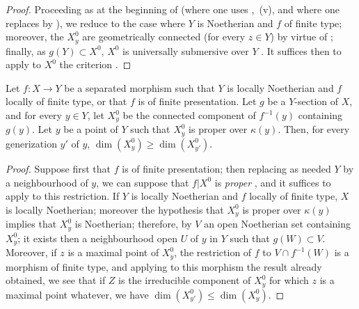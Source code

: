\begin{proof}
Proceeding as at the beginning of  (where one uses ,~(v), and where one replaces  by ), we reduce to the case where $Y$ is Noetherian and $f$ of finite type; moreover, the $X_y^0$ are geometrically connected (for every $z\in Y$) by virtue of ; finally, as $g(Y)\subset X^0$, $X^0$ is universally submersive over $Y$ .
It suffices then to apply to $X^0$ the criterion .
\end{proof}

\begin{corollary}[15.6.9]
\label{IV.15.6.9}
Let $f:X\to Y$ be a separated morphism such that $Y$ is locally Noetherian and $f$ locally of finite type, or that $f$ is of finite presentation.
Let $g$ be a $Y$-section of $X$, and for every $y\in Y$, let $X_y^0$ be the connected component of $f^{-1}(y)$ containing $g(y)$.
Let $y$ be a point of $Y$ such that $X_y^0$ is proper over $\kappa(y)$.
Then, for every generization $y'$ of $y$, $\dim(X_y^0)\geq\dim(X_{y'}^0)$.
\end{corollary}

\begin{proof}
Suppose first that $f$ is of finite presentation; then replacing as needed $Y$ by a neighbourhood of $y$, we can suppose that $f|X^0$ is \emph{proper} , and it suffices to apply  to this restriction.
If $Y$ is locally Noetherian and $f$ locally of finite type, $X$ is locally Noetherian; moreover the hypothesis that $X_y^0$ is proper over $\kappa(y)$ implies that $X_y^0$ is Noetherian; therefore, by $V$ an open Noetherian set containing $X_y^0$; it exists then a neighbourhood open $U$ of $y$ in $Y$ such that $g(W)\subset V$.
Moreover, if $z$ is a maximal point of $X_y^0$, the restriction of $f$ to $V\cap f^{-1}(W)$ is a morphism of finite type, and applying to this morphism the result already obtained, we see that if $Z$ is the irreducible component of $X_y^0$ for which $z$ is a maximal point whatever, we have $\dim(X_{y'}^0)\leq\dim(X_y^0)$.
\end{proof}

